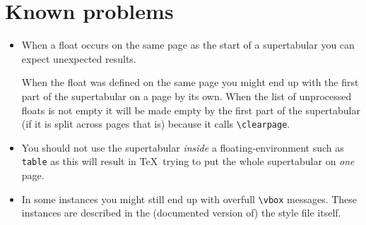 \section{Known problems}

\begin{itemize}
\item When a float occurs on the same page as the start of a supertabular you
can expect unexpected results.

When the float was defined on the same page you might end up with the first
part of the supertabular on a page by its own.
When the list of unprocessed floats is not empty it will be made empty by the
first part of the supertabular (if it is split across pages that is) because it
calls \verb=\clearpage=.
\item You should not use the supertabular {\em inside\/} a floating-environment
such as {\tt table} as this will result in \TeX\ trying to put the whole
supertabular on {\em one\/} page.
\item In some instances you might still end up with overfull \verb=\vbox=
messages. These instances are described in the (documented version of) the
style file itself.
\end{itemize}


